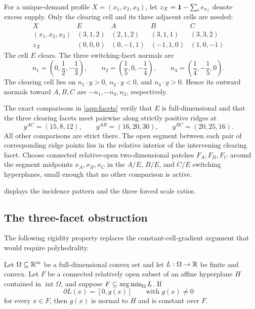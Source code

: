 For a unique-demand profile $X=(x_1,x_2,x_3)$, let $z_X=\mathbf{1}-\sum_i e_{x_i}$ denote excess supply. Only the clearing cell and its three adjacent cells are needed:
\begingroup
\setlength{\arraycolsep}{5pt}
\[
\begin{array}{c|cccc}
X&E&A&B&C\\ \hline
(x_1,x_2,x_3)&(3,1,2)&(2,1,2)&(3,1,1)&(3,3,2)\\
z_X&(0,0,0)&(0,-1,1)&(-1,1,0)&(1,0,-1)
\end{array}
\]
\endgroup
The cell $E$ clears. The three switching-facet normals are
\begin{equation}\label{eq:normals}
n_1=\left(0,\frac12,-\frac13\right),
\qquad
n_2=\left(\frac15,0,-\frac14\right),
\qquad
n_3=\left(\frac14,-\frac15,0\right).
\end{equation}
The clearing cell lies on $n_1\cdot y>0$, $n_2\cdot y<0$, and $n_3\cdot y>0$. Hence its outward normals toward $A,B,C$ are $-n_1,-n_3,n_2$, respectively.

The exact comparisons in \ref{app:facets} verify that $E$ is full-dimensional and that the three clearing facets meet pairwise along strictly positive ridges at
\begin{equation}\label{eq:ridge-points}
y^{AC}=(15,8,12),\qquad
y^{AB}=(16,20,30),\qquad
y^{BC}=(20,25,16).
\end{equation}
All other comparisons are strict there. The open segment between each pair of corresponding ridge points lies in the relative interior of the intervening clearing facet. Choose connected relative-open two-dimensional patches $F_A,F_B,F_C$ around the segment midpoints $x_A,x_B,x_C$ in the $A/E$, $B/E$, and $C/E$ switching hyperplanes, small enough that no other comparison is active.

 displays the incidence pattern and the three forced scale ratios.

\subsection{The three-facet obstruction}\label{subsec:three-facet}

The following rigidity property replaces the constant-cell-gradient argument that would require polyhedrality.

\begin{lemma}\label{lem:facet-rigidity}
Let $\Omega\subseteq\mathbb{R}^m$ be a full-dimensional convex set and let $L:\Omega\to\mathbb{R}$ be finite and convex. Let $F$ be a connected relatively open subset of an affine hyperplane $H$ contained in $\operatorname{int}\Omega$, and suppose $F\subseteq\operatorname*{arg\,min}_{\Omega} L$. If
\[
\partial L(x)=[0,g(x)]
\qquad\text{with }g(x)\ne0
\]
for every $x\in F$, then $g(x)$ is normal to $H$ and is constant over $F$.
\end{lemma}

